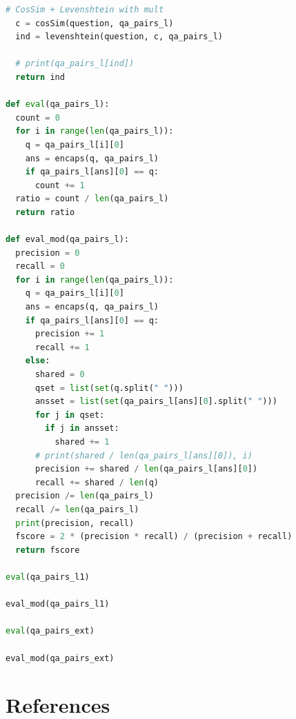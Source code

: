 \documentclass[12pt, a4paper]{article}
\begin{document}
\begin{lstlisting}[language = Python]
  # CosSim + Levenshtein with mult 
  c = cosSim(question, qa_pairs_l) 
  ind = levenshtein(question, c, qa_pairs_l) 
  
  # print(qa_pairs_l[ind])
  return ind 

def eval(qa_pairs_l): 
  count = 0 
  for i in range(len(qa_pairs_l)): 
    q = qa_pairs_l[i][0]
    ans = encaps(q, qa_pairs_l) 
    if qa_pairs_l[ans][0] == q: 
      count += 1 
  ratio = count / len(qa_pairs_l) 
  return ratio

def eval_mod(qa_pairs_l): 
  precision = 0 
  recall = 0 
  for i in range(len(qa_pairs_l)): 
    q = qa_pairs_l[i][0]
    ans = encaps(q, qa_pairs_l) 
    if qa_pairs_l[ans][0] == q: 
      precision += 1 
      recall += 1 
    else: 
      shared = 0 
      qset = list(set(q.split(" "))) 
      ansset = list(set(qa_pairs_l[ans][0].split(" ")))
      for j in qset: 
        if j in ansset: 
          shared += 1 
      # print(shared / len(qa_pairs_l[ans][0]), i)
      precision += shared / len(qa_pairs_l[ans][0]) 
      recall += shared / len(q) 
  precision /= len(qa_pairs_l) 
  recall /= len(qa_pairs_l) 
  print(precision, recall) 
  fscore = 2 * (precision * recall) / (precision + recall) 
  return fscore

eval(qa_pairs_l1) 

eval_mod(qa_pairs_l1) 

eval(qa_pairs_ext)

eval_mod(qa_pairs_ext) 
\end{lstlisting}

\newpage 
\section{References}
 
 
\end{document}
